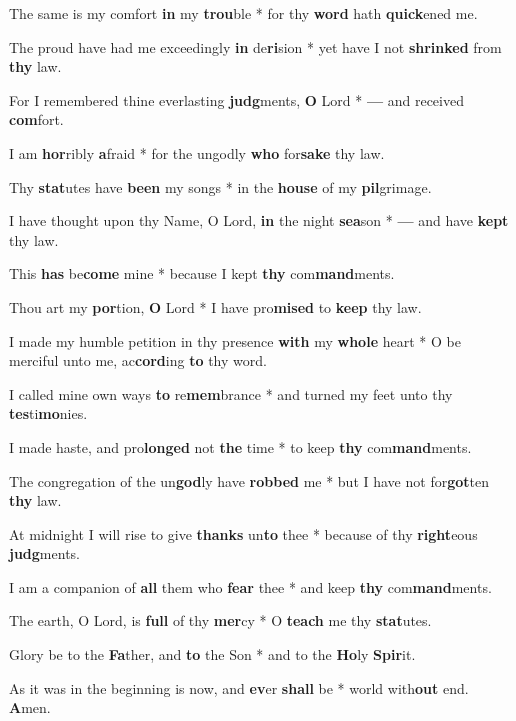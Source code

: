 \begin{multicols}{2}
	The same is my comfort \textbf{in} my \textbf{trou}ble * for thy \textbf{word} hath \textbf{quick}ened me.
	
	The proud have had me exceedingly \textbf{in} de\textbf{ri}sion * yet have I not \textbf{shrinked} from \textbf{thy} law.
	
	For I remembered thine everlasting \textbf{judg}ments, \textbf{O} Lord * \textbf{---} and received \textbf{com}fort.
	
	I am \textbf{hor}ribly \textbf{a}fraid * for the ungodly \textbf{who} for\textbf{sake} thy law.
	
	Thy \textbf{stat}utes have \textbf{been} my songs * in the \textbf{house} of my \textbf{pil}grimage.
	
	I have thought upon thy Name, O Lord, \textbf{in} the night \textbf{sea}son * \textbf{---} and have \textbf{kept} thy law.
	
	This \textbf{has} be\textbf{come} mine * because I kept \textbf{thy} com\textbf{mand}ments.
	
	Thou art my \textbf{por}tion, \textbf{O} Lord * I have pro\textbf{mised} to \textbf{keep} thy law.
	
	I made my humble petition in thy presence \textbf{with} my \textbf{whole} heart * O be merciful unto me, ac\textbf{cord}ing \textbf{to} thy word.
	
	I called mine own ways \textbf{to} re\textbf{mem}brance * and turned my feet unto thy \textbf{tes}ti\textbf{mo}nies.
	
	I made haste, and pro\textbf{longed} not \textbf{the} time * to keep \textbf{thy} com\textbf{mand}ments.
	
	The congregation of the un\textbf{god}ly have \textbf{robbed} me * but I have not for\textbf{got}ten \textbf{thy} law.
	
	At midnight I will rise to give \textbf{thanks} un\textbf{to} thee * because of thy \textbf{right}eous \textbf{judg}ments.
	
	I am a companion of \textbf{all} them who \textbf{fear} thee * and keep \textbf{thy} com\textbf{mand}ments.
	
	The earth, O Lord, is \textbf{full} of thy \textbf{mer}cy * O \textbf{teach} me thy \textbf{stat}utes.
	
	Glory be to the \textbf{Fa}ther, and \textbf{to} the Son * and to the \textbf{Ho}ly \textbf{Spir}it.
	
	As it was in the beginning is now, and \textbf{ev}er \textbf{shall} be * world with\textbf{out} end. \textbf{A}men.
\end{multicols}